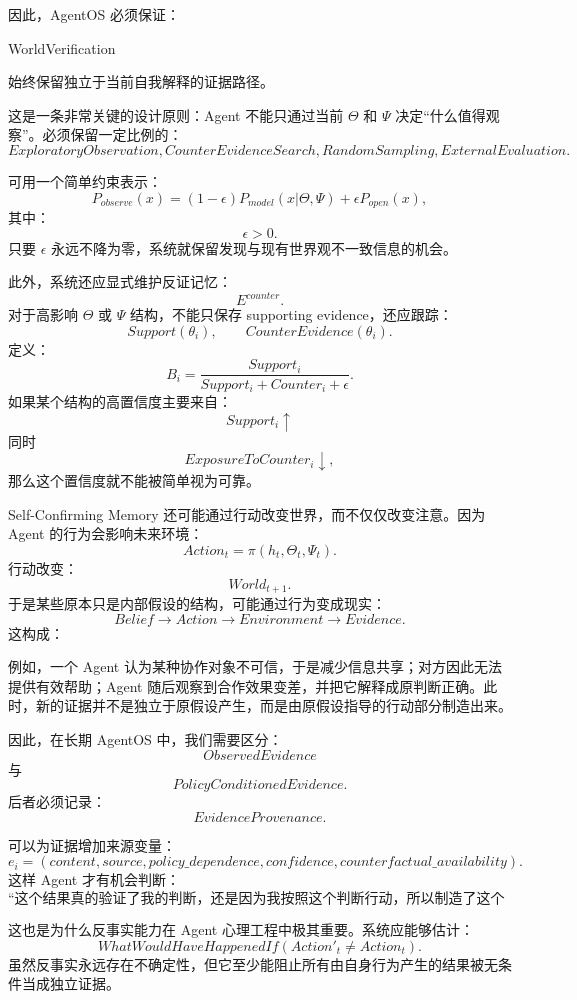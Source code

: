因此，AgentOS 必须保证：
\begin{statementbox}
WorldVerification
\end{statementbox}
始终保留独立于当前自我解释的证据路径。

这是一条非常关键的设计原则：Agent 不能只通过当前 $\Theta$ 和 $\Psi$ 决定“什么值得观察”。必须保留一定比例的：
\[
ExploratoryObservation,
CounterEvidenceSearch,
RandomSampling,
ExternalEvaluation.
\]

可用一个简单约束表示：
\[
P_{observe}(x)
=
(1-\epsilon)
P_{model}(x|\Theta,\Psi)
+
\epsilon P_{open}(x),
\]
其中：
\[
\epsilon>0.
\]
只要 $\epsilon$ 永远不降为零，系统就保留发现与现有世界观不一致信息的机会。

此外，系统还应显式维护反证记忆：
\[
E^{counter}.
\]
对于高影响 $\Theta$ 或 $\Psi$ 结构，不能只保存 supporting evidence，还应跟踪：
\[
Support(\theta_i),
\qquad
CounterEvidence(\theta_i).
\]
定义：
\[
B_i
=
\frac{
Support_i
}{
Support_i+Counter_i+\epsilon
}.
\]
如果某个结构的高置信度主要来自：
\[
Support_i\uparrow
\]
同时
\[
ExposureToCounter_i\downarrow,
\]
那么这个置信度就不能被简单视为可靠。

Self-Confirming Memory 还可能通过行动改变世界，而不仅仅改变注意。因为 Agent 的行为会影响未来环境：
\[
Action_t
=
\pi(h_t,\Theta_t,\Psi_t).
\]
行动改变：
\[
World_{t+1}.
\]
于是某些原本只是内部假设的结构，可能通过行为变成现实：
\[
Belief
\rightarrow
Action
\rightarrow
Environment
\rightarrow
Evidence.
\]
这构成：
\begin{statementbox}
\centering
{}
\end{statementbox}

例如，一个 Agent 认为某种协作对象不可信，于是减少信息共享；对方因此无法提供有效帮助；Agent 随后观察到合作效果变差，并把它解释成原判断正确。此时，新的证据并不是独立于原假设产生，而是由原假设指导的行动部分制造出来。

因此，在长期 AgentOS 中，我们需要区分：
\[
ObservedEvidence
\]
与
\[
PolicyConditionedEvidence.
\]
后者必须记录：
\[
EvidenceProvenance.
\]

可以为证据增加来源变量：
\[
e_i
=
(
content,
source,
policy\_dependence,
confidence,
counterfactual\_availability
).
\]
这样 Agent 才有机会判断：
\[
\text{“这个结果真的验证了我的判断，还是因为我按照这个判断行动，所以制造了这个结果？”}
\]

这也是为什么反事实能力在 Agent 心理工程中极其重要。系统应能够估计：
\[
WhatWouldHaveHappenedIf(Action'_t\neq Action_t).
\]
虽然反事实永远存在不确定性，但它至少能阻止所有由自身行为产生的结果被无条件当成独立证据。

